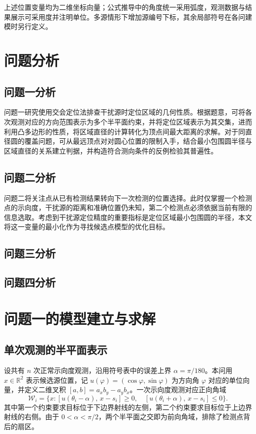 \documentclass[UTF8,a4paper,zihao=-4,fontset=none]{ctexart}
\begin{document}
上述位置变量均为二维坐标向量；公式推导中的角度统一采用弧度，观测数据与结果展示可采用度并注明单位。多源情形下增加源编号下标，其余局部符号在各问建模时另行定义。

\section{问题分析}
\subsection{问题一分析}

问题一研究使用交会定位法排查干扰源时定位区域的几何性质。根据题意，可将各次观测对应的方向范围表示为多个半平面约束，并将定位区域表示为其交集，进而利用凸多边形的性质，将区域直径的计算转化为顶点间最大距离的求解。对于同直径圆的覆盖问题，可从最远顶点对对圆心位置的限制入手，结合最小包围圆半径与区域直径的关系建立判据，并构造符合测向条件的反例检验其普遍性。

\subsection{问题二分析}

问题二将关注点从已有检测结果转向下一次检测的位置选择。此时仅掌握一个检测点的示向度，干扰源的距离和准确位置仍未知，第二个检测点必须依据当前有限的信息选取。考虑到干扰源定位精度的重要指标是定位区域最小包围圆的半径，本文将这一变量的最小化作为寻找候选点模型的优化目标。
\subsection{问题三分析}


\subsection{问题四分析}


\section{问题一的模型建立与求解}

\subsection{单次观测的半平面表示}

设共有 \(n\) 次正常示向度观测，沿用符号表中的误差上界 \(\alpha=\pi/180\)。本问用 \(x\in\mathbb R^2\) 表示候选源位置，记 \(u(\varphi)=(\cos\varphi,\sin\varphi)\) 为方向角 \(\varphi\) 对应的单位向量，并定义二维叉积 \([a,b]=a_xb_y-a_yb_x\)。一次示向度观测对应正向角域
\begin{equation}
  \mathcal W_i=\{x:[u(\theta_i-\alpha),\,x-s_i]\ge0,\quad [u(\theta_i+\alpha),\,x-s_i]\le0\}.
  \label{eq:wedge}
\end{equation}
其中第一个约束要求目标位于下边界射线的左侧，第二个约束要求目标位于上边界射线的右侧。由于 \(0<\alpha<\pi/2\)，两个半平面之交即为前向角域，排除了检测点背后的扇区。
\end{document}
